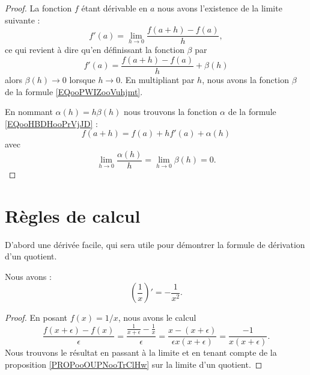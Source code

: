 \begin{proof}
    La fonction \( f\) étant dérivable en \( a\) nous avons l'existence de la limite suivante :
    \begin{equation}
        f'(a)=\lim_{h\to 0} \frac{ f(a+h)-f(a) }{ h },
    \end{equation}
    ce qui revient à dire qu'en définissant la fonction \( \beta\) par
    \begin{equation}
        f'(a)=\frac{ f(a+h)-f(a) }{ h }+\beta(h)
    \end{equation}
    alors \( \beta(h)\to 0\) lorsque \( h\to 0\). En multipliant par \( h\), nous avons la fonction \( \beta\) de la formule \eqref{EQooPWIZooVuhjmt}.

    En nommant \( \alpha(h)=h\beta(h)\) nous trouvons la fonction \( \alpha\) de la formule \eqref{EQooHBDHooPrVjJD} :
    \begin{equation}
        f(a+h)=f(a)+hf'(a)+\alpha(h)
    \end{equation}
    avec
    \begin{equation}
        \lim_{h\to 0} \frac{ \alpha(h) }{ h }=\lim_{h\to 0} \beta(h)=0.
    \end{equation}
\end{proof}

\section{Règles de calcul}

D'abord une dérivée facile, qui sera utile pour démontrer la formule de dérivation d'un quotient.
\begin{lemma}
    Nous avons :
    \begin{equation}
        \left( \frac{1}{ x } \right)'=-\frac{1}{ x^2 }.
    \end{equation}
\end{lemma}

\begin{proof}
    En posant \( f(x)=1/x\), nous avons le calcul
    \begin{equation}
        \frac{ f(x+\epsilon)-f(x) }{ \epsilon }=\frac{ \frac{1}{ x+\epsilon }-\frac{1}{ x } }{ \epsilon }=\frac{ x-(x+\epsilon) }{ \epsilon x(x+\epsilon) }=\frac{ -1 }{ x(x+\epsilon) }.
    \end{equation}
    Nous trouvons le résultat en passant à la limite et en tenant compte de la proposition \ref{PROPooOUPNooTrClHw} sur la limite d'un quotient.
\end{proof}


